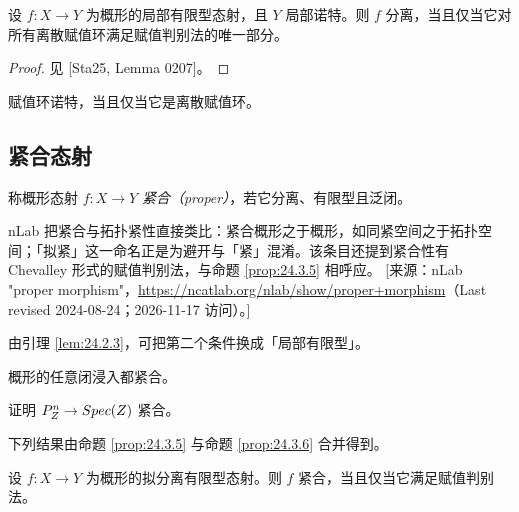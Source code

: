 \begin{proposition}\label{prop:24.3.8}
设 $f\colon X \to Y$ 为概形的局部有限型态射，且 $Y$ 局部诺特。则 $f$ 分离，当且仅当它对所有离散赋值环满足赋值判别法的唯一部分。
\end{proposition}

\begin{proof}
见 [Sta25, Lemma 0207]。
\end{proof}

\begin{remark}\label{rem:24.3.9}
赋值环诺特，当且仅当它是离散赋值环。
\end{remark}

\subsection{紧合态射}\label{sec:24.4}

\begin{definition}\label{def:24.4.1}
称概形态射 $f\colon X \to Y$ \emph{紧合（proper）}，若它分离、有限型且泛闭。
\end{definition}

\begin{yizhu}
nLab 把紧合与拓扑紧性直接类比：紧合概形之于概形，如同紧空间之于拓扑空间；「拟紧」这一命名正是为避开与「紧」混淆。该条目还提到紧合性有 Chevalley 形式的赋值判别法，与命题 \ref{prop:24.3.5} 相呼应。
[来源：nLab "proper morphism"，\url{https://ncatlab.org/nlab/show/proper+morphism}（Last revised 2024-08-24；2026-11-17 访问）。]
\end{yizhu}

\begin{remark}\label{rem:24.4.2}
由引理 \ref{lem:24.2.3}，可把第二个条件换成「局部有限型」。
\end{remark}

\begin{example}\label{ex:24.4.3}
概形的任意闭浸入都紧合。
\end{example}

\begin{exercise}\label{exc:24.4.4}
证明 $P^n_{Z} \to Spec(Z)$ 紧合。
\end{exercise}

下列结果由命题 \ref{prop:24.3.5} 与命题 \ref{prop:24.3.6} 合并得到。

\begin{corollary}\label{cor:24.4.5}
设 $f\colon X \to Y$ 为概形的拟分离有限型态射。则 $f$ 紧合，当且仅当它满足赋值判别法。
\end{corollary}


